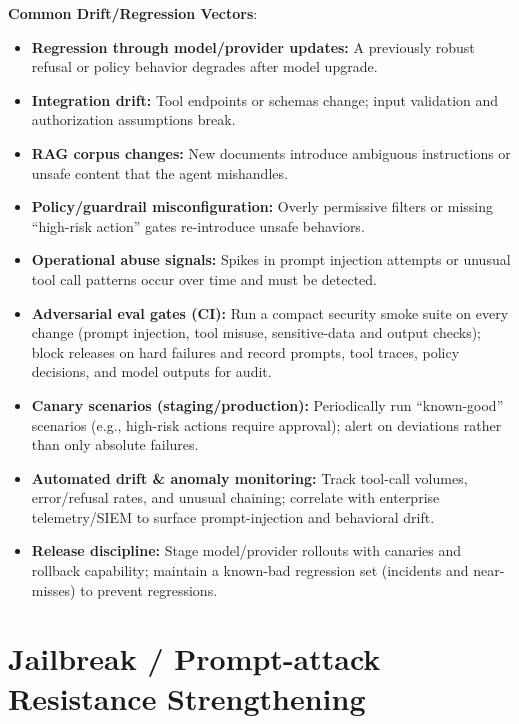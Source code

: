 \begin{TNtwocol}
    \textbf{Common Drift/Regression Vectors}:
    \begin{itemize}
        \item \textbf{Regression through model/provider updates:} A previously robust refusal or policy behavior degrades after model upgrade.
        \item \textbf{Integration drift:} Tool endpoints or schemas change; input validation and authorization assumptions break.
        \item \textbf{RAG corpus changes:} New documents introduce ambiguous instructions or unsafe content that the agent mishandles.
        \item \textbf{Policy/guardrail misconfiguration:} Overly permissive filters or missing “high-risk action” gates re-introduce unsafe behaviors.
        \item \textbf{Operational abuse signals:} Spikes in prompt injection attempts or unusual tool call patterns occur over time and must be detected.
    \end{itemize}

    \begin{itemize}
        \item \textbf{Adversarial eval gates (CI):} Run a compact security smoke suite on every change (prompt injection, tool misuse, sensitive-data and output checks); block releases on hard failures and record prompts, tool traces, policy decisions, and model outputs for audit.
        \item \textbf{Canary scenarios (staging/production):} Periodically run “known-good” scenarios (e.g., high-risk actions require approval); alert on deviations rather than only absolute failures.
        \item \textbf{Automated drift \& anomaly monitoring:} Track tool-call volumes, error/refusal rates, and unusual chaining; correlate with enterprise telemetry/SIEM to surface prompt-injection and behavioral drift.
        \item \textbf{Release discipline:} Stage model/provider rollouts with canaries and rollback capability; maintain a known-bad regression set (incidents and near-misses) to prevent regressions.
    \end{itemize}

    \section{Jailbreak / Prompt-attack Resistance Strengthening }


\end{TNtwocol}
